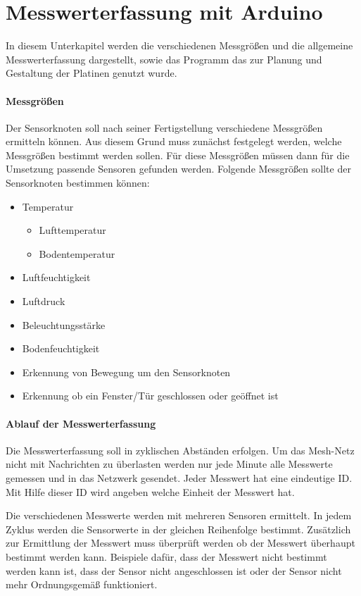 \section{Messwerterfassung mit Arduino}
\label{sec:MesswerterfassungArduino}
In diesem Unterkapitel werden die verschiedenen Messgrößen und die allgemeine Messwerterfassung dargestellt, sowie das Programm das zur Planung und Gestaltung der Platinen genutzt wurde.
\paragraph{Messgrößen} Der Sensorknoten soll nach seiner Fertigstellung verschiedene Messgrößen ermitteln können. Aus diesem Grund muss zunächst festgelegt werden, welche Messgrößen bestimmt werden sollen. Für diese Messgrößen müssen dann für die Umsetzung passende Sensoren gefunden werden. Folgende Messgrößen sollte der Sensorknoten bestimmen können:
\begin{itemize}
	\item Temperatur
	\begin{itemize}
		\item Lufttemperatur
		\item Bodentemperatur 
	\end{itemize}
	\item Luftfeuchtigkeit
	\item Luftdruck
	\item Beleuchtungsstärke
	\item Bodenfeuchtigkeit
	\item Erkennung von Bewegung um den Sensorknoten
	\item Erkennung ob ein Fenster/Tür geschlossen oder geöffnet ist
\end{itemize}
\paragraph{Ablauf der Messwerterfassung} Die Messwerterfassung soll in zyklischen Abständen erfolgen. Um das Mesh-Netz nicht mit Nachrichten zu überlasten werden nur jede Minute alle Messwerte gemessen und in das Netzwerk gesendet. Jeder Messwert hat eine eindeutige ID. Mit Hilfe dieser ID wird angeben welche Einheit der Messwert hat. 

Die verschiedenen Messwerte werden mit mehreren Sensoren ermittelt. In jedem Zyklus werden die Sensorwerte in der gleichen Reihenfolge bestimmt. Zusätzlich zur Ermittlung der Messwert muss überprüft werden ob der Messwert überhaupt bestimmt werden kann. Beispiele dafür,  dass der Messwert nicht bestimmt werden kann ist, dass der Sensor nicht angeschlossen ist oder der Sensor nicht mehr Ordnungsgemäß funktioniert. 

